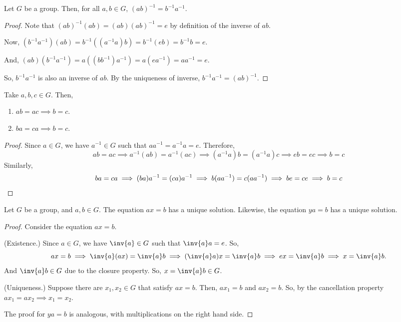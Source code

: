 \documentclass[11pt]{penrose}
\begin{document}
\begin{nthm}
    Let $G$ be a group. Then, for all $a, b \in G$, $(ab)^{-1} = b^{-1} a^{-1}$.
\end{nthm}
\begin{proof}
    Note that $(ab)^{-1} (ab) = (ab) (ab)^{-1} = e$ by definition of the inverse of $ab$.

    Now, $(b^{-1} a^{-1}) (a b) = b^{-1} ((a^{-1} a) b) = b^{-1} (e b) = b^{-1} b = e$.

    And, $(a b) (b^{-1} a^{-1}) = a ((b b^{-1}) a^{-1}) = a (e a^{-1}) = a a^{-1} = e$.

    So, $b^{-1} a^{-1}$ is also an inverse of $ab$. By the uniqueness of inverse, $b^{-1} a^{-1} = (ab)^{-1}$.
\end{proof}

\begin{nthm}
    Take $a, b, c \in G$. Then,
    \begin{enumerate}
        \item $ab = ac \implies b = c$.
        \item $ba = ca \implies b = c$.
    \end{enumerate}
\end{nthm}
\begin{proof}
    Since $a \in G$, we have $a^{-1} \in G$ such that $a a^{-1} = a^{-1} a = e$. Therefore,
    \begin{equation*}
        ab = ac
        \implies a^{-1} (ab) = a^{-1} (ac)
        \implies (a^{-1} a)b = (a^{-1} a)c
        \implies eb = ec
        \implies b = c
    \end{equation*}
    Similarly,
    \begin{equation*}
        ba = ca
        \implies (ba)a^{-1} = (ca)a^{-1}
        \implies b (a a^{-1}) = c (a a^{-1})
        \implies be = ce
        \implies b = c
        \qedhere
    \end{equation*}
\end{proof}

\begin{nthm}
    Let $G$ be a group, and $a, b \in G$. The equation $a x = b$ has a unique solution. Likewise, the equation $y a = b$ has a unique solution.
\end{nthm}
\begin{proof}
    Consider the equation $a x = b$.

    (Existence.) Since $a \in G$, we have $\inv{a} \in G$ such that $\inv{a} a = e$. So,
    \begin{equation*}
        ax = b
        \implies \inv{a} (a x) = \inv{a} b
        \implies (\inv{a} a) x = \inv{a} b
        \implies e x = \inv{a} b
        \implies x = \inv{a} b.
    \end{equation*}
    And $\inv{a} b \in G$ due to the closure property. So, $x = \inv{a} b \in G$.

    (Uniqueness.) Suppose there are $x_1, x_2 \in G$ that satisfy $a x = b$. Then, $a x_1 = b$ and $a x_2 = b$. So, by the cancellation property $a x_1 = a x_2 \implies x_1 = x_2$.
    
    The proof for $y a = b$ is analogous, with multiplications on the right hand side.
\end{proof}
\end{document}
